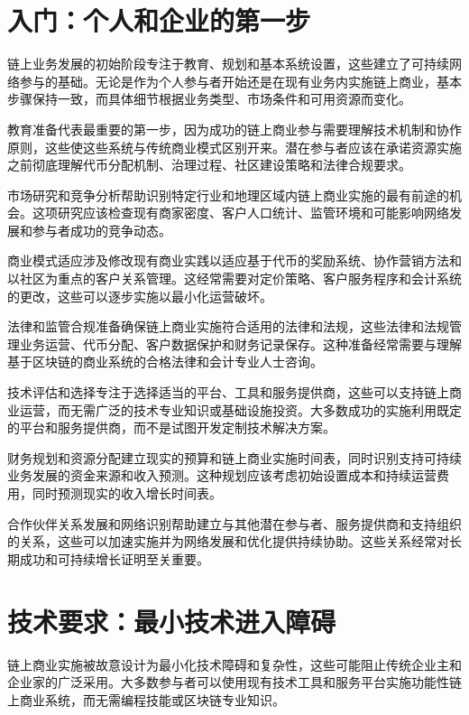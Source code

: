 \documentclass[
  Letterpaper,
]{scrbook}
\begin{document}
\section{入门：个人和企业的第一步}\label{ux5165ux95e8ux4e2aux4ebaux548cux4f01ux4e1aux7684ux7b2cux4e00ux6b65}

链上业务发展的初始阶段专注于教育、规划和基本系统设置，这些建立了可持续网络参与的基础。无论是作为个人参与者开始还是在现有业务内实施链上商业，基本步骤保持一致，而具体细节根据业务类型、市场条件和可用资源而变化。

教育准备代表最重要的第一步，因为成功的链上商业参与需要理解技术机制和协作原则，这些使这些系统与传统商业模式区别开来。潜在参与者应该在承诺资源实施之前彻底理解代币分配机制、治理过程、社区建设策略和法律合规要求。

市场研究和竞争分析帮助识别特定行业和地理区域内链上商业实施的最有前途的机会。这项研究应该检查现有商家密度、客户人口统计、监管环境和可能影响网络发展和参与者成功的竞争动态。

商业模式适应涉及修改现有商业实践以适应基于代币的奖励系统、协作营销方法和以社区为重点的客户关系管理。这经常需要对定价策略、客户服务程序和会计系统的更改，这些可以逐步实施以最小化运营破坏。

法律和监管合规准备确保链上商业实施符合适用的法律和法规，这些法律和法规管理业务运营、代币分配、客户数据保护和财务记录保存。这种准备经常需要与理解基于区块链的商业系统的合格法律和会计专业人士咨询。

技术评估和选择专注于选择适当的平台、工具和服务提供商，这些可以支持链上商业运营，而无需广泛的技术专业知识或基础设施投资。大多数成功的实施利用既定的平台和服务提供商，而不是试图开发定制技术解决方案。

财务规划和资源分配建立现实的预算和链上商业实施时间表，同时识别支持可持续业务发展的资金来源和收入预测。这种规划应该考虑初始设置成本和持续运营费用，同时预测现实的收入增长时间表。

合作伙伴关系发展和网络识别帮助建立与其他潜在参与者、服务提供商和支持组织的关系，这些可以加速实施并为网络发展和优化提供持续协助。这些关系经常对长期成功和可持续增长证明至关重要。

\section{技术要求：最小技术进入障碍}\label{ux6280ux672fux8981ux6c42ux6700ux5c0fux6280ux672fux8fdbux5165ux969cux788d}

链上商业实施被故意设计为最小化技术障碍和复杂性，这些可能阻止传统企业主和企业家的广泛采用。大多数参与者可以使用现有技术工具和服务平台实施功能性链上商业系统，而无需编程技能或区块链专业知识。
\end{document}
